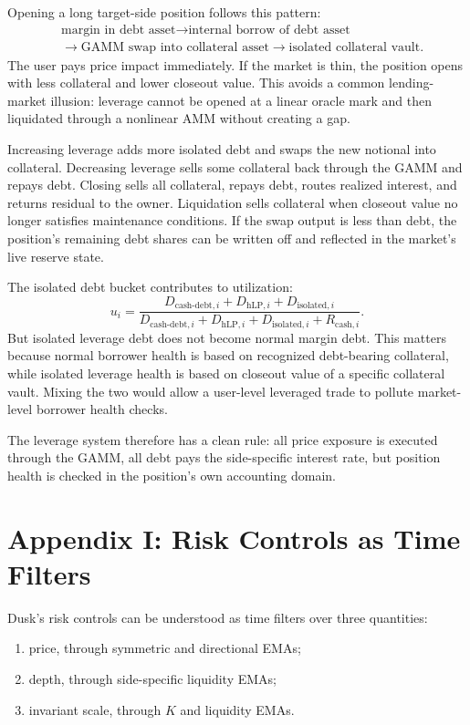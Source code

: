 \documentclass[11pt]{article}
\newcommand{\cash}{\mathrm{cash}}
\newcommand{\hlp}{\mathrm{hLP}}
\newcommand{\debt}{\mathrm{debt}}
\begin{document}
Opening a long target-side position follows this pattern:
\[
\begin{aligned}
&\text{margin in debt asset}
\rightarrow \text{internal borrow of debt asset}\\
&\rightarrow \text{GAMM swap into collateral asset}
\rightarrow \text{isolated collateral vault}.
\end{aligned}
\]
The user pays price impact immediately. If the market is thin, the position opens with less collateral and lower closeout value. This avoids a common lending-market illusion: leverage cannot be opened at a linear oracle mark and then liquidated through a nonlinear AMM without creating a gap.

Increasing leverage adds more isolated debt and swaps the new notional into collateral. Decreasing leverage sells some collateral back through the GAMM and repays debt. Closing sells all collateral, repays debt, routes realized interest, and returns residual to the owner. Liquidation sells collateral when closeout value no longer satisfies maintenance conditions. If the swap output is less than debt, the position's remaining debt shares can be written off and reflected in the market's live reserve state.

The isolated debt bucket contributes to utilization:
\begin{equation}
u_i=\frac{D_{\cash\text{-}\debt,i}+D_{\hlp,i}+D_{\mathrm{isolated},i}}
{D_{\cash\text{-}\debt,i}+D_{\hlp,i}+D_{\mathrm{isolated},i}+R_{\cash,i}}.
\end{equation}
But isolated leverage debt does not become normal margin debt. This matters because normal borrower health is based on recognized debt-bearing collateral, while isolated leverage health is based on closeout value of a specific collateral vault. Mixing the two would allow a user-level leveraged trade to pollute market-level borrower health checks.

The leverage system therefore has a clean rule: all price exposure is executed through the GAMM, all debt pays the side-specific interest rate, but position health is checked in the position's own accounting domain.

\section{Appendix I: Risk Controls as Time Filters}

Dusk's risk controls can be understood as time filters over three quantities:
\begin{enumerate}
  \item price, through symmetric and directional EMAs;
  \item depth, through side-specific liquidity EMAs;
  \item invariant scale, through $K$ and liquidity EMAs.
\end{enumerate}
\end{document}
